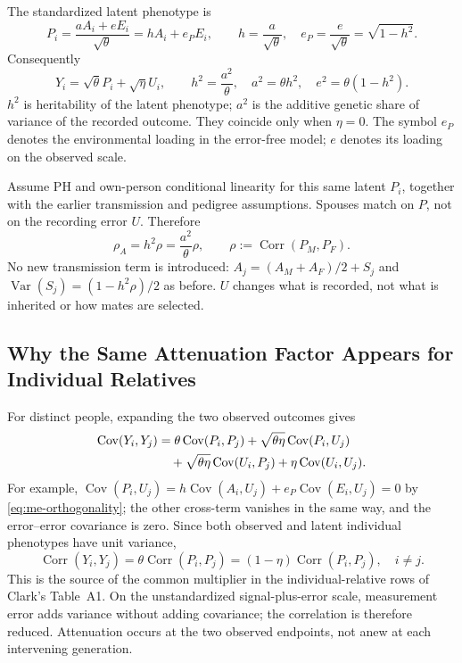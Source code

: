 The standardized latent phenotype is
\begin{equation}
 P_i=\frac{aA_i+eE_i}{\sqrt{\theta}}
     =hA_i+e_P E_i,\qquad
 h=\frac{a}{\sqrt{\theta}},\quad
 e_P=\frac{e}{\sqrt{\theta}}=\sqrt{1-h^2}.
 \label{eq:me-latent}
\end{equation}
Consequently
\[
 Y_i=\sqrt{\theta}P_i+\sqrt{\eta}U_i,\qquad
 h^2=\frac{a^2}{\theta},\quad
 a^2=\theta h^2,\quad e^2=\theta(1-h^2).
\]
$h^2$ is heritability of the latent phenotype; $a^2$ is the additive
genetic share of variance of the recorded outcome. They coincide only
when $\eta=0$. The symbol $e_P$ denotes the environmental loading in
the error-free model; $e$ denotes its loading on the observed scale.

Assume PH and own-person conditional linearity for this same latent
$P_i$, together with the earlier transmission and pedigree assumptions.
Spouses match on $P$, not on the recording error $U$. Therefore
\begin{equation}
 \rho_A=h^2\rho=\frac{a^2}{\theta}\rho,\qquad
 \rho:=\operatorname{Corr}(P_M,P_F).
 \label{eq:me-spouse-restriction}
\end{equation}
No new transmission term is introduced: $A_j=(A_M+A_F)/2+S_j$ and
$\operatorname{Var}(S_j)=(1-h^2\rho)/2$ as before. $U$ changes what is
recorded, not what is inherited or how mates are selected.

\subsection{Why the Same Attenuation Factor Appears for Individual Relatives}
\label{sec:me-attenuation}

For distinct people, expanding the two observed outcomes gives
\begin{align}
 \operatorname{Cov}(Y_i,Y_j)
 &=\theta\operatorname{Cov}(P_i,P_j)
   +\sqrt{\theta\eta}\operatorname{Cov}(P_i,U_j)\notag\\
 &\quad+\sqrt{\theta\eta}\operatorname{Cov}(U_i,P_j)
   +\eta\operatorname{Cov}(U_i,U_j).
 \label{eq:me-expansion}
\end{align}
For example,
$\operatorname{Cov}(P_i,U_j)
=h\operatorname{Cov}(A_i,U_j)+e_P\operatorname{Cov}(E_i,U_j)=0$
by \eqref{eq:me-orthogonality}; the other cross-term vanishes in the
same way, and the error--error covariance is zero. Since both observed
and latent individual phenotypes have unit variance,
\begin{equation}
 \boxed{\operatorname{Corr}(Y_i,Y_j)
   =\theta\operatorname{Corr}(P_i,P_j)
   =(1-\eta)\operatorname{Corr}(P_i,P_j),\quad i\ne j.}
 \label{eq:me-attenuation}
\end{equation}
This is the source of the common multiplier in the individual-relative
rows of Clark's Table~A1. On the unstandardized signal-plus-error scale,
measurement error adds variance without adding covariance; the
correlation is therefore reduced. Attenuation occurs at the two observed
endpoints, not anew at each intervening generation.

